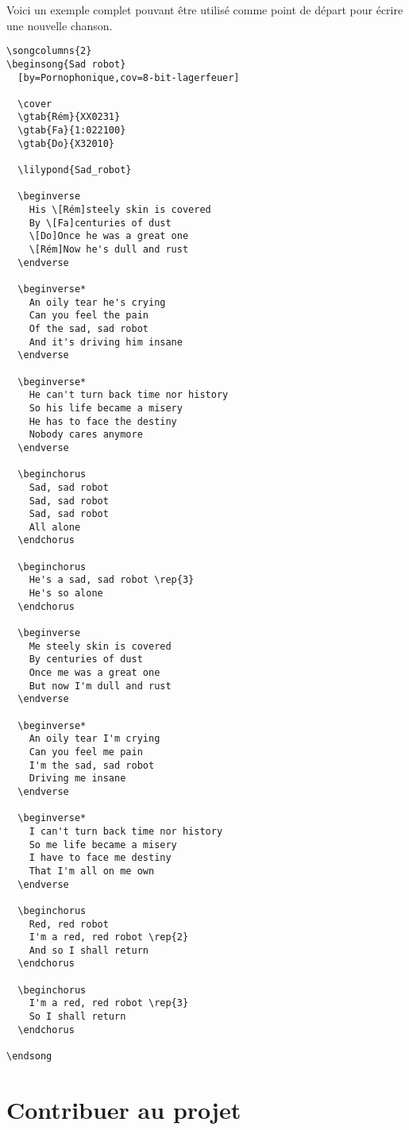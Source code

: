 \documentclass[online]{patacrep}
\begin{document}
Voici un exemple complet pouvant être utilisé comme point de départ
pour écrire une nouvelle chanson.

\begin{verbatim}
\songcolumns{2}
\beginsong{Sad robot}
  [by=Pornophonique,cov=8-bit-lagerfeuer]

  \cover
  \gtab{Rém}{XX0231}
  \gtab{Fa}{1:022100}
  \gtab{Do}{X32010}

  \lilypond{Sad_robot}

  \beginverse
    His \[Rém]steely skin is covered
    By \[Fa]centuries of dust
    \[Do]Once he was a great one
    \[Rém]Now he's dull and rust
  \endverse

  \beginverse*
    An oily tear he's crying
    Can you feel the pain
    Of the sad, sad robot
    And it's driving him insane
  \endverse

  \beginverse*
    He can't turn back time nor history
    So his life became a misery
    He has to face the destiny
    Nobody cares anymore
  \endverse

  \beginchorus
    Sad, sad robot
    Sad, sad robot
    Sad, sad robot
    All alone
  \endchorus

  \beginchorus
    He's a sad, sad robot \rep{3}
    He's so alone
  \endchorus

  \beginverse
    Me steely skin is covered
    By centuries of dust
    Once me was a great one
    But now I'm dull and rust
  \endverse

  \beginverse*
    An oily tear I'm crying
    Can you feel me pain
    I'm the sad, sad robot
    Driving me insane
  \endverse

  \beginverse*
    I can't turn back time nor history
    So me life became a misery
    I have to face me destiny
    That I'm all on me own
  \endverse

  \beginchorus
    Red, red robot
    I'm a red, red robot \rep{2}
    And so I shall return
  \endchorus

  \beginchorus
    I'm a red, red robot \rep{3}
    So I shall return
  \endchorus

\endsong
\end{verbatim}

\section{Contribuer au projet}
\end{document}
